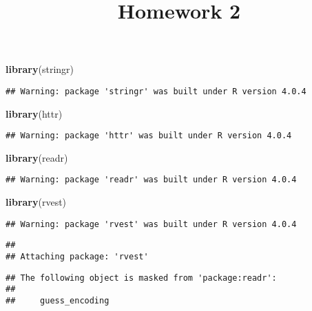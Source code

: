 \documentclass[
]{article}
\title{Homework 2}
\author{}
\date{\vspace{-2.5em}}
\newenvironment{Shaded}{\begin{snugshade}}{\end{snugshade}}
\newcommand{\KeywordTok}[1]{\textcolor[rgb]{0.13,0.29,0.53}{\textbf{#1}}}
\newcommand{\NormalTok}[1]{#1}
\begin{document}
\maketitle

\begin{Shaded}
\begin{Highlighting}[]
\KeywordTok{library}\NormalTok{(stringr)}
\end{Highlighting}
\end{Shaded}

\begin{verbatim}
## Warning: package 'stringr' was built under R version 4.0.4
\end{verbatim}

\begin{Shaded}
\begin{Highlighting}[]
\KeywordTok{library}\NormalTok{(httr)}
\end{Highlighting}
\end{Shaded}

\begin{verbatim}
## Warning: package 'httr' was built under R version 4.0.4
\end{verbatim}

\begin{Shaded}
\begin{Highlighting}[]
\KeywordTok{library}\NormalTok{(readr)}
\end{Highlighting}
\end{Shaded}

\begin{verbatim}
## Warning: package 'readr' was built under R version 4.0.4
\end{verbatim}

\begin{Shaded}
\begin{Highlighting}[]
\KeywordTok{library}\NormalTok{(rvest)}
\end{Highlighting}
\end{Shaded}

\begin{verbatim}
## Warning: package 'rvest' was built under R version 4.0.4
\end{verbatim}

\begin{verbatim}
## 
## Attaching package: 'rvest'
\end{verbatim}

\begin{verbatim}
## The following object is masked from 'package:readr':
## 
##     guess_encoding
\end{verbatim}
\end{document}
